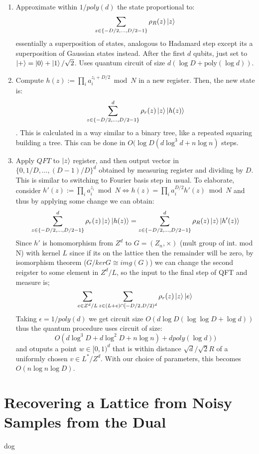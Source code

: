 \documentclass{article}
\begin{document}
\begin{enumerate}
	\item Approximate within $1/poly(d)$ the state proportional to:
		$$\sum_{z \in \{ -D/2, \dots, D/2-1\}} \rho_R(z) \ket{z}$$
		essentially a superposition of states, analogous to Hadamard step except its a superposition of Gaussian states instead. After the first $d$ qubits, just set to $\ket{+} = \ket{0}+\ket{1}/\sqrt{2}$. Uses quantum circuit of size $d(\log D + \text{poly}(\log d))$.
	\item Compute $h(z) := \prod_i a_i^{z_i + D/2} \bmod N$ in a new register. Then, the new state is:
		$$\sum_{z \in \{ -D/2, \dots, D/2-1\}}^d \rho_r(z) \ket{z} \ket{h(z)}$$. This is calculated in a way similar to a binary tree, like a repeated squaring building a tree. This can be done in $O(\log D (d \log^3 d + n \log n)$ steps.
\item Apply $QFT$ to $\ket{z}$ register, and then output vector in $\{ 0, 1/D, \dots, (D-1)/D\}^d$ obtained by measuring register and dividing by $D$. This is similar to switching to Fourier basis step in usual. To elaborate, consider $h'(z) := \prod_i a_i^{z_i} \bmod N \iff h(z) = \prod_i a_i^{D/2} h'(z) \bmod N$ and thus by applying some change we can obtain:
	$$\sum_{z \in \{ -D/2, \dots, D/2-1\}}^d \rho_r(z) \ket{z} \ket{h(z)} = \sum_{z\in \{ -D/2, \dots, D/2-1\}}^d \rho_R(z) \ket{z} \ket{h'(z)}$$
	Since $h'$ is homomorphism from $Z^d$ to $G= (Z_n, \times)$ (mult group of int. mod N) with kernel $L$ since if its on the lattice then the remainder will be zero, by isomorphism theorem ($G/ker G \cong img(G)$) we can change the second reigster to some element in $Z^d/L$, so the input to the final step of QFT and measure is;
	$$\sum_{e \in Z^d/L}  \sum_{z \in (L+e) \cap [-D/2, D/2)^d} \rho_r(z) \ket{z} \ket{e}$$
	Taking $\epsilon = 1/poly(d)$ we get circuit size $O(d \log D (\log \log D + \log d))$ thus the quantum procedure uses circuit of size:
	$$O(d \log^3 D  + d \log^2 D + n \log n) + d poly(\log d))$$
	and otuputs a point $w \in [0,1)^d$ that is within distance $\sqrt{d}/\sqrt{2}R$ of a uniformly chosen $v \in L^*/Z^d$. With our choice of parameters, this becomes $O(n \log n \log D)$.
\end{enumerate}
\section*{Recovering a Lattice from Noisy Samples from the Dual}
dog
\end{document}
